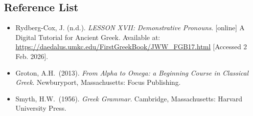 \documentclass[10pt,a4paper,notitlepage]{article}
\begin{document}
    \subsection*{Reference List}
    \begin{itemize}[label={}, leftmargin=0]
        \item Rydberg-Cox, J. (n.d.). \textit{LESSON XVII: Demonstrative Pronouns}. [online] A Digital Tutorial for Ancient Greek. Available at: \url{https://daedalus.umkc.edu/FirstGreekBook/JWW_FGB17.html} [Accessed 2 Feb. 2026].
        \item Groton, A.H.\ (2013). \textit{From Alpha to Omega: a Beginning Course in Classical Greek}. Newburyport, Massachusetts: Focus Publishing.
        \item Smyth, H.W.\ (1956). \textit{Greek Grammar}. Cambridge, Massachusetts: Harvard University Press.
    \end{itemize}
\end{document}
